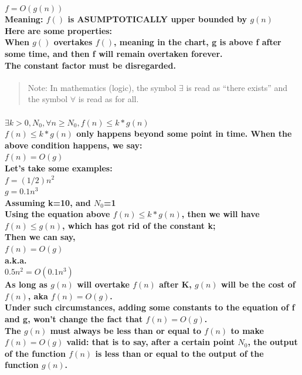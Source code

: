 \documentclass{article}
\begin{document}
\paragraph{$ f = O(g(n)) $\\
Meaning: $f()$ is ASUMPTOTICALLY upper bounded by $g(n)$\\
Here are some properties:\\
When $g()$ overtakes $f()$, meaning in the chart, g is above f after some time, and then f will remain overtaken forever.\\
The constant factor must be disregarded.\\}

\begin{quote}
    Note: In mathematics (logic), the symbol $\exists$ is read as “there exists” and the symbol $\forall$ is read as for all.\\
\end{quote}

\paragraph{$ \exists k>0,N_0, \forall n \geq N_0, f(n) \leq k*g(n) $\\
$f(n) \leq k*g(n)$ only happens beyond some point in time. When the above condition happens, we say:\\
$ f(n) = O(g) $\\
Let's take some examples:\\
$ f=(1/2)n^2 $\\
$ g=0.1n^3 $\\
Assuming k=10, and $N_0$=1\\
Using the equation above $f(n) \leq k*g(n)$, then we will have $f(n) \leq g(n)$, which has got rid of the constant k;\\
Then we can say,\\
$f(n) = O(g) $\\
a.k.a. \\
$0.5n^2=O(0.1n^3) $\\
As long as $g(n)$ will overtake $f(n)$ after K, $g(n)$ will be the cost of $f(n)$, aka $f(n)=O(g)$.\\
Under such circumstances, adding some constants to the equation of f and g, won't change the fact that $f(n)=O(g)$.\\
The $g(n)$ must always be less than or equal to $f(n)$ to make $f(n) = O(g)$ valid: 
that is to say, after a certain point $N_0$, the output of the function $f(n)$ is less than or equal to the output of the function $g(n)$.}
\end{document}
